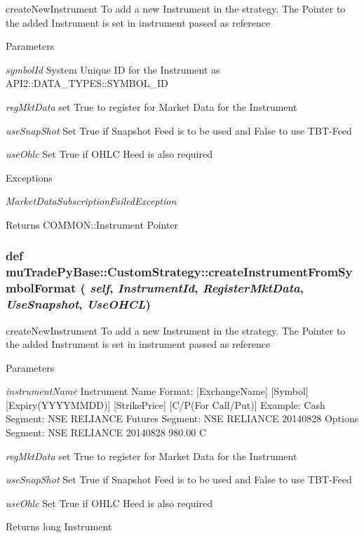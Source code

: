 createNewInstrument To add a new Instrument in the strategy. The Pointer to the added Instrument is set in instrument passed as reference 
\begin{DoxyParams}{Parameters}
\item[{\em symbolId}]System Unique ID for the Instrument as API2::DATA\_\-TYPES::SYMBOL\_\-ID \item[{\em regMktData}]set True to register for Market Data for the Instrument \item[{\em useSnapShot}]Set True if Snapshot Feed is to be used and False to use TBT-\/Feed \item[{\em useOhlc}]Set True if OHLC Heed is also required \end{DoxyParams}

\begin{DoxyExceptions}{Exceptions}
\item[{\em MarketDataSubscriptionFailedException}]\end{DoxyExceptions}
\begin{DoxyReturn}{Returns}
COMMON::Instrument Pointer 
\end{DoxyReturn}
\hypertarget{classmuTradePyBase_1_1CustomStrategy_ab198cb371a98954673637288d3ab07c8}{
\subsubsection[{createInstrumentFromSymbolFormat}]{\setlength{\rightskip}{0pt plus 5cm}def muTradePyBase::CustomStrategy::createInstrumentFromSymbolFormat ( {\em self}, \/   {\em InstrumentId}, \/   {\em RegisterMktData}, \/   {\em UseSnapshot}, \/   {\em UseOHCL})}}
\label{classmuTradePyBase_1_1CustomStrategy_ab198cb371a98954673637288d3ab07c8}


createNewInstrument To add a new Instrument in the strategy. The Pointer to the added Instrument is set in instrument passed as reference 
\begin{DoxyParams}{Parameters}
\item[{\em instrumentName}]Instrument Name Format: \mbox{[}ExchangeName\mbox{]} \mbox{[}Symbol\mbox{]} \mbox{[}Expiry(YYYYMMDD)\mbox{]} \mbox{[}StrikePrice\mbox{]} \mbox{[}C/P(For Call/Put)\mbox{]} Example: Cash Segment: NSE RELIANCE Futures Segment: NSE RELIANCE 20140828 Options Segment: NSE RELIANCE 20140828 980.00 C \item[{\em regMktData}]set True to register for Market Data for the Instrument \item[{\em useSnapShot}]Set True if Snapshot Feed is to be used and False to use TBT-\/Feed \item[{\em useOhlc}]Set True if OHLC Heed is also required \end{DoxyParams}
\begin{DoxyReturn}{Returns}
long Instrument 
\end{DoxyReturn}

